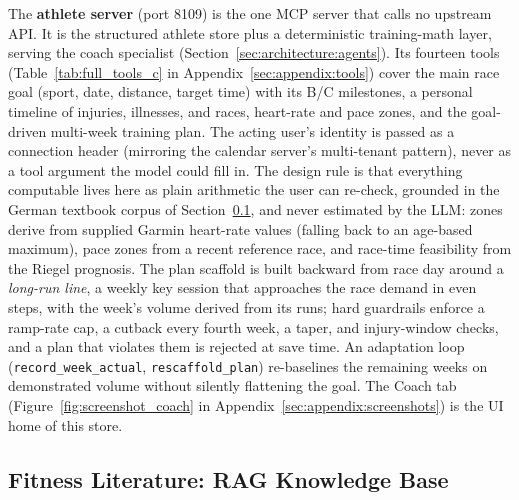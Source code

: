 The \textbf{athlete server} (port 8109) is the one MCP server that calls no upstream API. It is the structured athlete store plus a deterministic training-math layer, serving the coach specialist (Section~\ref{sec:architecture:agents}). Its fourteen tools (Table~\ref{tab:full_tools_c} in Appendix~\ref{sec:appendix:tools}) cover the main race goal (sport, date, distance, target time) with its B/C milestones, a personal timeline of injuries, illnesses, and races, heart-rate and pace zones, and the goal-driven multi-week training plan. The acting user's identity is passed as a connection header (mirroring the calendar server's multi-tenant pattern), never as a tool argument the model could fill in. The design rule is that everything computable lives here as plain arithmetic the user can re-check, grounded in the German textbook corpus of Section~\ref{sec:data:rag}, and never estimated by the LLM: zones derive from supplied Garmin heart-rate values (falling back to an age-based maximum), pace zones from a recent reference race, and race-time feasibility from the Riegel prognosis. The plan scaffold is built backward from race day around a \textit{long-run line}, a weekly key session that approaches the race demand in even steps, with the week's volume derived from its runs; hard guardrails enforce a ramp-rate cap, a cutback every fourth week, a taper, and injury-window checks, and a plan that violates them is rejected at save time. An adaptation loop (\texttt{record\_week\_actual}, \texttt{rescaffold\_plan}) re-baselines the remaining weeks on demonstrated volume without silently flattening the goal. The Coach tab (Figure~\ref{fig:screenshot_coach} in Appendix~\ref{sec:appendix:screenshots}) is the UI home of this store.

\subsection{Fitness Literature: RAG Knowledge Base}\label{sec:data:rag}

